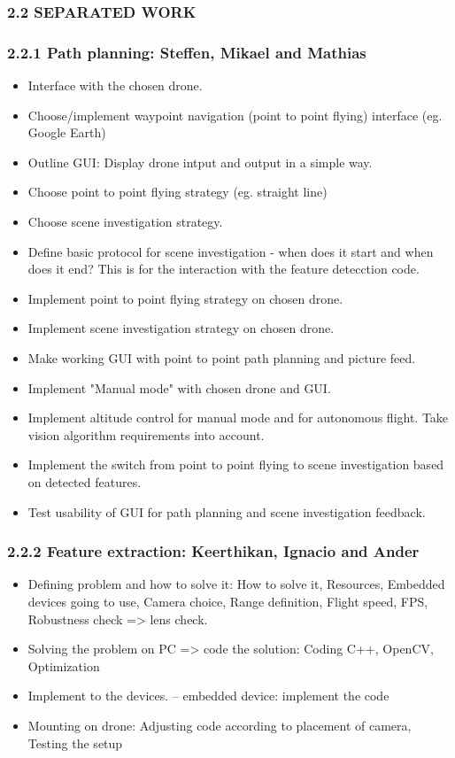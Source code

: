 \subsubsection*{2.2 SEPARATED WORK}
\subsubsection*{2.2.1 Path planning: Steffen, Mikael and Mathias}
\begin{itemize}
\item Interface with the chosen drone.
\item Choose/implement waypoint navigation (point to point flying) interface (eg. Google Earth)
\item Outline GUI: Display drone intput and output in a simple way.
\item Choose point to point flying strategy (eg. straight line)
\item Choose scene investigation strategy.
\item Define basic protocol for scene investigation - 
when does it start and when does it end? 
This is for the interaction with the feature detecction code.
\item Implement point to point flying strategy on chosen drone.
\item Implement scene investigation strategy on chosen drone.
\item Make working GUI with point to point path planning and picture feed.
\item Implement "Manual mode" with chosen drone and GUI.
\item Implement altitude control for manual mode and for autonomous flight. 
Take vision algorithm requirements into account.
\item Implement the switch from point to point flying to scene investigation based on detected features.
\item Test usability of GUI for path planning and scene investigation feedback. \end{itemize}

\subsubsection*{2.2.2 Feature extraction: Keerthikan, Ignacio and Ander}
\begin{itemize}
\item Defining problem and how to solve it: How to solve it, 
Resources, Embedded devices going to use, 
Camera choice, Range definition, Flight speed, FPS, 
Robustness check => lens check.
\item Solving the problem on PC => code the solution:
 Coding C++, OpenCV, Optimization
\item Implement to the devices. – embedded device: implement the code
\item Mounting on drone: Adjusting code according to placement of camera, Testing the setup
\end{itemize}

